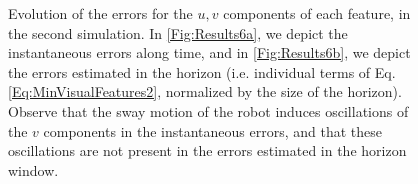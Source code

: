 \begin{figure}[ht]
 \centering
 \caption[]{\label{Fig:Results6}\small{Evolution of the errors for the $u,v$ components of each feature, in the second simulation. In \ref{Fig:Results6a}, we depict the instantaneous errors along time, and in \ref{Fig:Results6b}, we depict the errors estimated in the horizon (i.e. individual terms of Eq.~ \ref{Eq:MinVisualFeatures2}, normalized by the size of the horizon). Observe that the sway motion of the robot induces oscillations of the $v$ components in the instantaneous errors, and that these oscillations are not present in the errors estimated in the horizon window.}}
 \end{figure}

